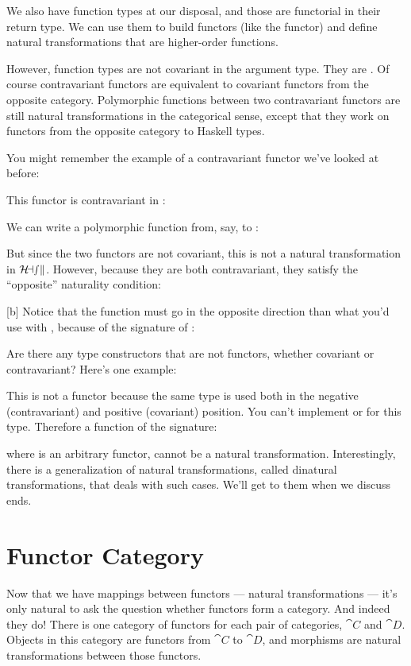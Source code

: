 We also have function types at our disposal, and those are functorial in
their return type. We can use them to build functors (like the
 functor) and define natural transformations that are
higher-order functions.

However, function types are not covariant in the argument type. They are
. Of course contravariant functors are equivalent to
covariant functors from the opposite category. Polymorphic functions
between two contravariant functors are still natural transformations in
the categorical sense, except that they work on functors from the
opposite category to Haskell types.

You might remember the example of a contravariant functor we've looked
at before:

This functor is contravariant in :

We can write a polymorphic function from, say,  to
:

But since the two functors are not covariant, this is not a natural
transformation in $\mathcal{H\mkern-3mu ask}$. However, because they are both
contravariant, they satisfy the ``opposite'' naturality condition:

[b]
Notice that the function  must go in the opposite direction
than what you'd use with , because of the signature of
:

Are there any type constructors that are not functors, whether covariant
or contravariant? Here's one example:

This is not a functor because the same type  is used both in
the negative (contravariant) and positive (covariant) position. You
can't implement  or  for this type.
Therefore a function of the signature:

where  is an arbitrary functor, cannot be a natural
transformation. Interestingly, there is a generalization of natural
transformations, called dinatural transformations, that deals with such
cases. We'll get to them when we discuss ends.

\section{Functor Category}

Now that we have mappings between functors --- natural transformations
--- it's only natural to ask the question whether functors form a
category. And indeed they do! There is one category of functors for each
pair of categories, $\cat{C}$ and $\cat{D}$. Objects in this category are functors from
$\cat{C}$ to $\cat{D}$, and morphisms are natural transformations between those
functors.


